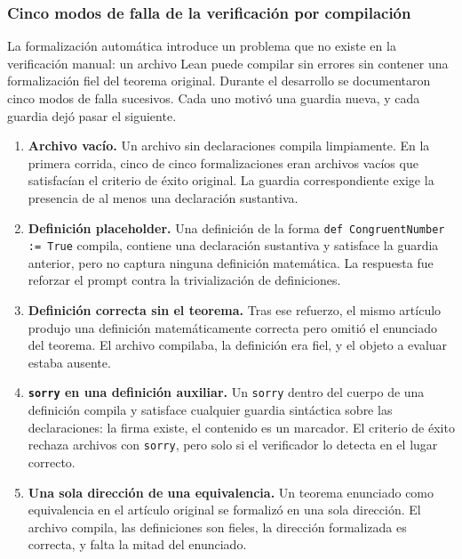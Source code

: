 \documentclass[12pt,a4paper]{article}
\theoremstyle{remark}
\begin{document}
\subsubsection{Cinco modos de falla de la verificación por compilación}
\label{ssec:modosfalla}

La formalización automática introduce un problema que no existe en la verificación manual: un archivo Lean puede compilar sin errores sin contener una formalización fiel del teorema original. Durante el desarrollo se documentaron cinco modos de falla sucesivos. Cada uno motivó una guardia nueva, y cada guardia dejó pasar el siguiente.

\begin{enumerate}
\item \textbf{Archivo vacío.} Un archivo sin declaraciones compila limpiamente. En la primera corrida, cinco de cinco formalizaciones eran archivos vacíos que satisfacían el criterio de éxito original. La guardia correspondiente exige la presencia de al menos una declaración sustantiva.

\item \textbf{Definición placeholder.} Una definición de la forma \texttt{def CongruentNumber := True} compila, contiene una declaración sustantiva y satisface la guardia anterior, pero no captura ninguna definición matemática. La respuesta fue reforzar el prompt contra la trivialización de definiciones.

\item \textbf{Definición correcta sin el teorema.} Tras ese refuerzo, el mismo artículo produjo una definición matemáticamente correcta pero omitió el enunciado del teorema. El archivo compilaba, la definición era fiel, y el objeto a evaluar estaba ausente.

\item \textbf{\texttt{sorry} en una definición auxiliar.} Un \texttt{sorry} dentro del cuerpo de una definición compila y satisface cualquier guardia sintáctica sobre las declaraciones: la firma existe, el contenido es un marcador. El criterio de éxito rechaza archivos con \texttt{sorry}, pero solo si el verificador lo detecta en el lugar correcto.

\item \textbf{Una sola dirección de una equivalencia.} Un teorema enunciado como equivalencia en el artículo original se formalizó en una sola dirección. El archivo compila, las definiciones son fieles, la dirección formalizada es correcta, y falta la mitad del enunciado.
\end{enumerate}
\end{document}
